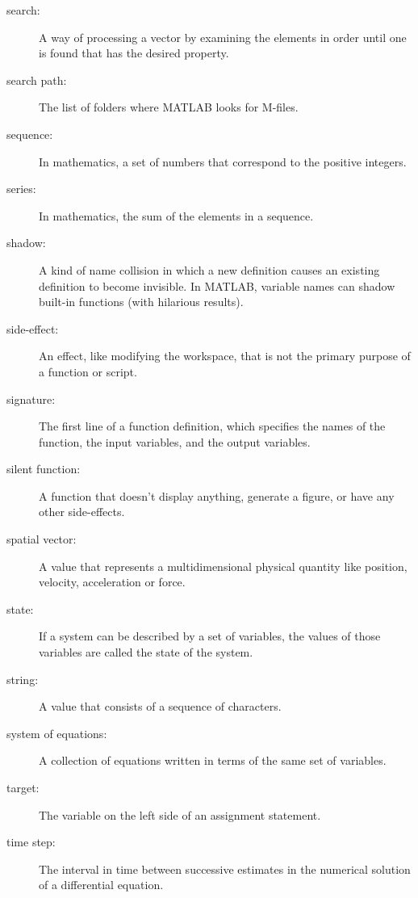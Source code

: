 \begin{description}
\item[search:] A way of processing a vector by examining the
elements in order until one is found that has the desired property.

\item[search path:] The list of folders where MATLAB looks for
M-files.

\item[sequence:] In mathematics, a set of numbers that correspond
to the positive integers.

\item[series:] In mathematics, the sum of the elements in a sequence.

\item[shadow:] A kind of name collision in which a new definition
causes an existing definition to become invisible.  In MATLAB,
variable names can shadow built-in functions (with hilarious results).

\item[side-effect:] An effect, like modifying the workspace, that
is not the primary purpose of a function or script.

\item[signature:] The first line of a function definition, which
specifies the names of the function, the input variables, and the
output variables.

\item[silent function:] A function that doesn't display anything,
generate a figure, or have any other side-effects.

\item[spatial vector:] A value that represents a
multidimensional physical quantity like position, velocity,
acceleration or force.

\item[state:] If a system can be described by a set of variables,
the values of those variables are called the state of the system.

\item[string:] A value that consists of a sequence of characters.

\item[system of equations:] A collection of equations written in terms of
the same set of variables.

\item[target:] The variable on the left side of an assignment statement.

\item[time step:] The interval in time between successive estimates
in the numerical solution of a differential equation.


\end{description}
